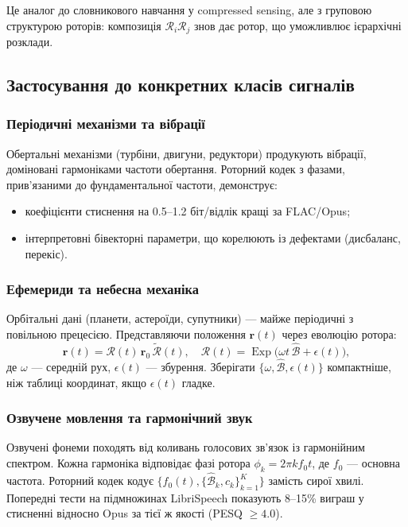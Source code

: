 \documentclass[11pt,a4paper]{article}
\newcommand{\rev}[1]{\widetilde{#1}}           %
\newcommand{\Exp}{\operatorname{Exp}}
\newcommand{\Rotor}{\mathcal{R}}
\newcommand{\Biv}{\mathcal{B}}
\theoremstyle{definition}
\theoremstyle{plain}
\theoremstyle{remark}
\begin{document}
Це аналог до словникового навчання у compressed sensing, але з груповою структурою роторів: композиція $\Rotor_i \Rotor_j$ знов дає ротор, що уможливлює ієрархічні розклади.

\subsection{Застосування до конкретних класів сигналів}

\subsubsection{Періодичні механізми та вібрації}

Обертальні механізми (турбіни, двигуни, редуктори) продукують вібрації, доміновані гармоніками частоти обертання. Роторний кодек з фазами, прив’язаними до фундаментальної частоти, демонструє:
\begin{itemize}
  \item коефіцієнти стиснення на 0.5–1.2 біт/відлік кращі за FLAC/Opus;
  \item інтерпретовні бівекторні параметри, що корелюють із дефектами (дисбаланс, перекіс).
\end{itemize}

\subsubsection{Ефемериди та небесна механіка}

Орбітальні дані (планети, астероїди, супутники) — майже періодичні з повільною прецесією. Представляючи положення $\mathbf{r}(t)$ через еволюцію ротора:
\begin{equation}
\mathbf{r}(t) = \Rotor(t)\, \mathbf{r}_0\, \rev{\Rotor}(t), \quad \Rotor(t) = \Exp\!\big(\omega t\, \hat{\Biv} + \epsilon(t)\big),
\end{equation}
де $\omega$ — середній рух, $\epsilon(t)$ — збурення. Зберігати $\{\omega, \hat{\Biv}, \epsilon(t)\}$ компактніше, ніж таблиці координат, якщо $\epsilon(t)$ гладке.

\subsubsection{Озвучене мовлення та гармонічний звук}

Озвучені фонеми походять від коливань голосових зв’язок із гармонійним спектром. Кожна гармоніка відповідає фазі ротора $\phi_k = 2\pi k f_0 t$, де $f_0$ — основна частота. Роторний кодек кодує $\{f_0(t), \{\hat{\Biv}_k, c_k\}_{k=1}^K\}$ замість сирої хвилі. Попередні тести на підмножинах LibriSpeech показують 8–15\% виграш у стисненні відносно Opus за тієї ж якості (PESQ $\ge 4.0$).
\end{document}
